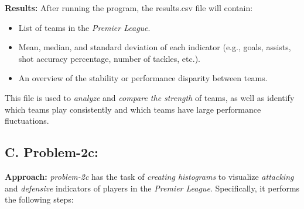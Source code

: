 \documentclass[12pt]{article}
\begin{document}
\textbf{Results:} After running the program, the results.csv file will contain:

\begin{itemize}
    \item List of teams in the \textit{Premier League}.
    \item Mean, median, and standard deviation of each indicator (e.g., goals, assists, shot accuracy percentage, number of tackles, etc.).
    \item An overview of the stability or performance disparity between teams.
\end{itemize}

This file is used to \textit{analyze} and \textit{compare the strength} of teams, as well as identify which teams play consistently and which teams have large performance fluctuations.

\subsection*{C. Problem-2c:}
\textbf{Approach:} \textit{problem-2c} has the task of \textit{creating histograms} to visualize \textit{attacking} and \textit{defensive} indicators of players in the \textit{Premier League}. Specifically, it performs the following steps:
\end{document}
